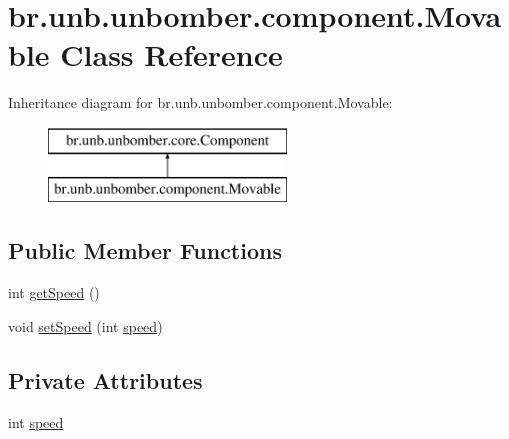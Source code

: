 \hypertarget{classbr_1_1unb_1_1unbomber_1_1component_1_1_movable}{\section{br.\+unb.\+unbomber.\+component.\+Movable Class Reference}
\label{classbr_1_1unb_1_1unbomber_1_1component_1_1_movable}
}
Inheritance diagram for br.\+unb.\+unbomber.\+component.\+Movable\+:\begin{figure}[H]
\begin{center}
\leavevmode
\includegraphics[height=2.000000cm]{classbr_1_1unb_1_1unbomber_1_1component_1_1_movable}
\end{center}
\end{figure}
\subsection*{Public Member Functions}
\begin{DoxyCompactItemize}
\item 
int \hyperlink{classbr_1_1unb_1_1unbomber_1_1component_1_1_movable_aae626aa66b8c608684c48f30210ade4d}{get\+Speed} ()
\item 
void \hyperlink{classbr_1_1unb_1_1unbomber_1_1component_1_1_movable_a112b6d6cf83c41fd29e053be171dbd53}{set\+Speed} (int \hyperlink{classbr_1_1unb_1_1unbomber_1_1component_1_1_movable_a6cae298cc5f02ca24f01e673018eb737}{speed})
\end{DoxyCompactItemize}
\subsection*{Private Attributes}
\begin{DoxyCompactItemize}
\item 
int \hyperlink{classbr_1_1unb_1_1unbomber_1_1component_1_1_movable_a6cae298cc5f02ca24f01e673018eb737}{speed}
\end{DoxyCompactItemize}


